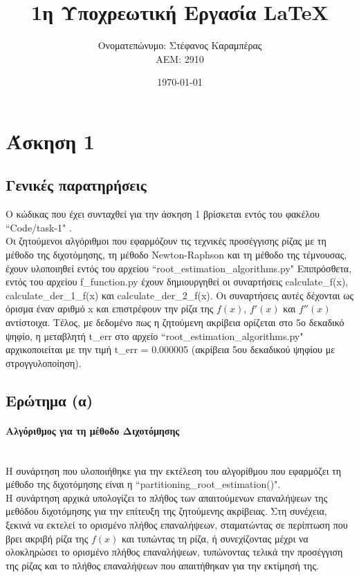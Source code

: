 \documentclass[a4paper,11pt]{article}
\title{1η Υποχρεωτική Εργασία \lt LaTeX} %
\author{Ονοματεπώνυμο: Στέφανος Καραμπέρας  \\  ΑΕΜ: 2910}       %
\date{\today}                                      %
\newcommand{\lt}{\latintext}
\begin{document}

\maketitle

\section*{Άσκηση 1}
	\subsection*{Γενικές παρατηρήσεις}
	Ο κώδικας που έχει συνταχθεί για την άσκηση 1 βρίσκεται εντός του φακέλου {\lt ``Code/task-1" }.\\
	Οι ζητούμενοι αλγόριθμοι που εφαρμόζουν τις τεχνικές προσέγγισης ρίζας με τη μέθοδο της διχοτόμησης, τη μέθοδο {\lt Newton-Raphson} και τη μέθοδο της τέμνουσας, έχουν υλοποιηθεί
	εντός του αρχείου {\lt ``root\_estimation\_algorithms.py"}
	Επιπρόσθετα, εντός του αρχείου {\lt f\_function.py} έχουν δημιουργηθεί οι συναρτήσεις {\lt calculate\_f(x)}, {\lt calculate\_der\_1\_f(x)} και {\lt calculate\_der\_2\_f(x)}. Οι συναρτήσεις αυτές δέχονται ως όρισμα έναν
	αριθμό x και επιστρέφουν την ρίζα της {\lt $f(x)$}, {\lt $f'(x)$} και {\lt $f''(x)$} αντίστοιχα.
	Τέλος, με δεδομένο πως η ζητούμενη ακρίβεια ορίζεται στο 5ο δεκαδικό ψηφίο, η μεταβλητή {\lt t\_err}  στο αρχείο {\lt ``root\_estimation\_algorithms.py"} αρχικοποιείται με την τιμή {\lt t\_err} = 0.000005 (ακρίβεια 5ου δεκαδικού 		ψηφίου με στρογγυλοποίηση).
	\subsection*{Ερώτημα (α)}
		\paragraph{Αλγόριθμος για τη μέθοδο Διχοτόμησης}\mbox{} \\
			Η συνάρτηση που υλοποιήθηκε για την εκτέλεση του αλγορίθμου που εφαρμόζει τη μέθοδο της διχοτόμησης είναι η {\lt ``partitioning\_root\_estimation()"}. \\
			Η συνάρτηση αρχικά υπολογίζει το πλήθος των απαιτούμενων επαναλήψεων της μεθόδου διχοτόμησης για την επίτευξη της ζητούμενης ακρίβειας.  Στη συνέχεια, ξεκινά να εκτελεί το ορισμένο πλήθος επαναλήψεων, 					σταματώντας σε περίπτωση που βρει ακριβή ρίζα της {\lt$f(x)$} και τυπώντας τη ρίζα, ή συνεχίζοντας μέχρι να ολοκληρώσει το ορισμένο πλήθος επαναλήψεων, τυπώνοντας τελικά την προσέγγιση της ρίζας και το 						πλήθος επαναλήψεων που απαιτήθηκαν για την εκτίμησή της.
\end{document}
